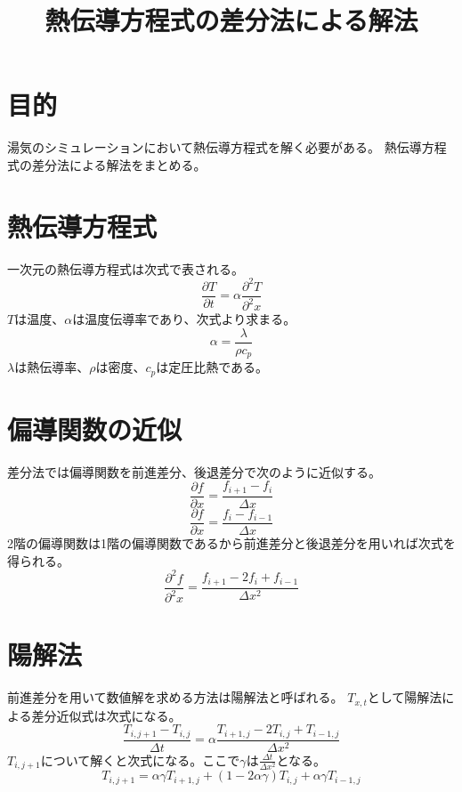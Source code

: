 \documentclass{ujarticle}
\title{熱伝導方程式の差分法による解法}
\begin{document}
\maketitle
\section{目的}
湯気のシミュレーションにおいて熱伝導方程式を解く必要がある。
熱伝導方程式の差分法による解法をまとめる。
\section{熱伝導方程式}
一次元の熱伝導方程式は次式で表される。
\begin{equation}
\frac{\partial T}{\partial t} = \alpha \frac{\partial^2T}{\partial^2x}
\end{equation}
$T$は温度、$\alpha$は温度伝導率であり、次式より求まる。
\begin{equation}
\alpha=\frac{\lambda}{\rho c_{p}}
\end{equation}
$\lambda$は熱伝導率、$\rho$は密度、$c_{p}$は定圧比熱である。
\section{偏導関数の近似}
差分法では偏導関数を前進差分、後退差分で次のように近似する。
\begin{equation}
\frac{\partial f}{\partial x}=\frac{f_{i+1}-f_{i}}{\Delta x}
\end{equation}
\begin{equation}
\frac{\partial f}{\partial x}=\frac{f_{i}-f_{i-1}}{\Delta x}
\end{equation}
2階の偏導関数は1階の偏導関数であるから前進差分と後退差分を用いれば次式を得られる。
\begin{equation}
\frac{\partial^2 f}{\partial^2 x} = \frac{f_{i+1}-2f_{i}+f_{i-1}}{\Delta x^2}
\end{equation}
\section{陽解法}
前進差分を用いて数値解を求める方法は陽解法と呼ばれる。
$T_{x,t}$として陽解法による差分近似式は次式になる。
\begin{equation}
\frac{T_{i,j+1} - T_{i,j}}{\Delta t} = \alpha\frac{T_{i+1,j}-2T_{i,j}+T_{i-1,j}}{\Delta x^2}
	\end{equation}
$T_{i,j+1}$について解くと次式になる。ここで$\gamma$は$\frac{\Delta t}{\Delta x^2}$となる。
\begin{equation}
T_{i,j+1}=\alpha \gamma T_{i+1,j} + (1-2 \alpha \gamma)T_{i,j}+\alpha \gamma T_{i-1,j}
\end{equation}
\end{document}
